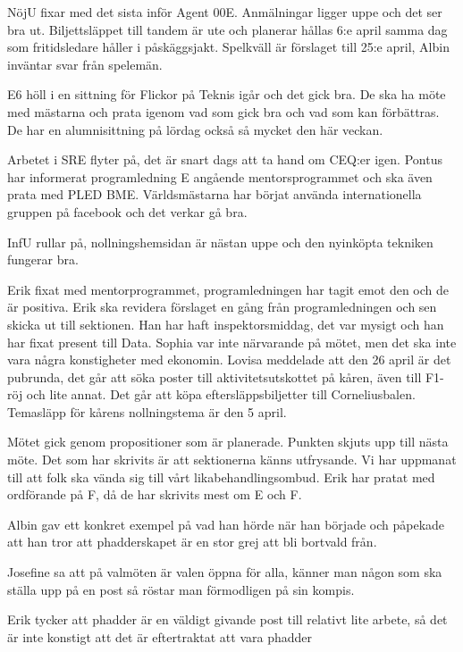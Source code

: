 \documentclass[10pt]{article}
\begin{document}
\begin{paragrafer}
\begin{paragrafer}
NöjU fixar med det sista inför Agent 00E. Anmälningar ligger uppe och det ser bra ut. Biljettsläppet till tandem är ute och planerar hållas 6:e april samma dag som fritidsledare håller i påskäggsjakt. Spelkväll är förslaget till 25:e april, Albin inväntar svar från spelemän.

E6 höll i en sittning för Flickor på Teknis igår och det gick bra. De ska ha möte med mästarna och prata igenom vad som gick bra och vad som kan förbättras.
De har en alumnisittning på lördag också så mycket den här veckan.

Arbetet i SRE flyter på, det är snart dags att ta hand om CEQ:er igen. Pontus har informerat programledning E angående mentorsprogrammet och ska även prata med PLED BME. Världsmästarna har börjat använda internationella gruppen på facebook och det verkar gå bra.

InfU rullar på, nollningshemsidan är nästan uppe och den nyinköpta tekniken fungerar bra.

Erik fixat med mentorprogrammet, programledningen har tagit emot den och de är positiva. Erik ska revidera förslaget en gång från programledningen och sen skicka ut till sektionen. Han har haft inspektorsmiddag, det var mysigt och han har fixat present till Data.
Sophia var inte närvarande på mötet, men det ska inte vara några konstigheter med ekonomin.
Lovisa meddelade att den 26 april är det pubrunda, det går att söka poster till aktivitetsutskottet på kåren, även till F1-röj och lite annat. Det går att köpa eftersläppsbiljetter till Corneliusbalen. Temasläpp för kårens nollningstema är den 5 april.
\end{paragrafer}
Mötet gick genom propositioner som är planerade.
Punkten skjuts upp till nästa möte.
Det som har skrivits är att sektionerna känns utfrysande. Vi har uppmanat till att folk ska vända sig till vårt likabehandlingsombud. Erik har pratat med ordförande på F, då de har skrivits mest om E och F.

Albin gav ett konkret exempel på vad han hörde när han började och påpekade att han tror att phadderskapet är en stor grej att bli bortvald från.

Josefine sa att på valmöten är valen öppna för alla, känner man någon som ska ställa upp på en post så röstar man förmodligen på sin kompis.

Erik tycker att phadder är en väldigt givande post till relativt lite arbete, så det är inte konstigt att det är eftertraktat att vara phadder


\end{paragrafer}
\end{document}
